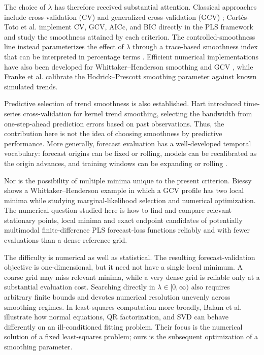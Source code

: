 \documentclass[english]{smcca}
\begin{document}
The choice of \(\lambda\) has therefore received substantial attention. Classical approaches include cross-validation (CV) and generalized cross-validation (GCV) \cite{craven1979gcv}; Cortés-Toto et al. \cite{cortes2017smoothness} implement CV, GCV, AICc, and BIC directly in the PLS framework and study the smoothness attained by each criterion. The controlled-smoothness line instead parameterizes the effect of \(\lambda\) through a trace-based smoothness index that can be interpreted in percentage terms \cite{guerrero2008smoothness,cortes2017smoothness}. Efficient numerical implementations have also been developed for Whittaker--Henderson smoothing and GCV \cite{weinert2007wh}, while Franke et al. \cite{franke2026hp} calibrate the Hodrick--Prescott smoothing parameter against known simulated trends.

Predictive selection of trend smoothness is also established. Hart \cite{hart1994tscv} introduced time-series cross-validation for kernel trend smoothing, selecting the bandwidth from one-step-ahead prediction errors based on past observations. Thus, the contribution here is not the idea of choosing smoothness by predictive performance. More generally, forecast evaluation has a well-developed temporal vocabulary: forecast origins can be fixed or rolling, models can be recalibrated as the origin advances, and training windows can be expanding or rolling \cite{tashman2000oos,bergmeir2012cv}.

Nor is the possibility of multiple minima unique to the present criterion. Biessy \cite{biessy2026wh} shows a Whittaker--Henderson example in which a GCV profile has two local minima while studying marginal-likelihood selection and numerical optimization. The numerical question studied here is how to find and compare relevant stationary points, local minima and exact endpoint candidates of potentially multimodal finite-difference PLS forecast-loss functions reliably and with fewer evaluations than a dense reference grid.

The difficulty is numerical as well as statistical. The resulting forecast-validation objective is one-dimensional, but it need not have a single local minimum. A coarse grid may miss relevant minima, while a very dense grid is reliable only at a substantial evaluation cost. Searching directly in \(\lambda\in[0,\infty)\) also requires arbitrary finite bounds and devotes numerical resolution unevenly across smoothing regimes. In least-squares computation more broadly, Balam et al. \cite{balam2025overview} illustrate how normal equations, QR factorization, and SVD can behave differently on an ill-conditioned fitting problem. Their focus is the numerical solution of a fixed least-squares problem; ours is the subsequent optimization of a smoothing parameter.
\end{document}
